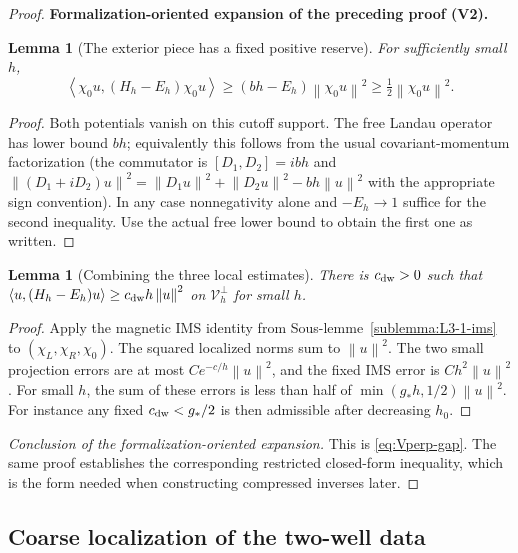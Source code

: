 \documentclass[11pt]{article}
\newtheorem{lemma}[theorem]{Lemma}
\newcommand{\formalisationparentid}{X}
\newenvironment{formalisationaddition}[1]{\par\medskip\begingroup\color{blue}\def\formalisationparentid{#1}\setcounter{formalizationsublemma}{0}\let\lemma\formalizationsublemma\let\endlemma\endformalizationsublemma
  \def\Eo{\mathcal E_h^\circ}\def\EE{\mathcal E_h}\def\phio{\phi_h^\circ}\def\phih{\phi_h}\def\Ho{H_h^{\rm atom}(v^\circ)}\def\Ha{H_h^{\rm atom}}\def\HL{H_h^{L}}\def\Dh{D_h}\def\Log{\operatorname{Log}}\def\ellh{\ell_h}\def\Gp{G_{p,h}}\def\Ast{A_{*,h}}\def\ahat{\widehat{\mathfrak a}_h}\def\ah{\mathfrak a_h}\def\rh{\widehat\rho_h}\def\deltah{\widehat\delta_h}\def\oldref##1{\textup{(##1)}}\def\interface##1{\par\noindent\textit{Analytical interface used here.} ##1\par}\def\finish{\par\noindent\textit{Conclusion of the formalization-oriented expansion.} }\par\noindent\textbf{Formalization-oriented expansion of the preceding proof (V2).}\par\smallskip
}{\par\endgroup\medskip
}
\newcommand{\norm}[1]{\left\|#1\right\|}
\newcommand{\ip}[2]{\left\langle #1,#2\right\rangle}
\begin{document}
\begin{proof}
\begin{formalisationaddition}{T4.2}
\begin{lemma}[The exterior piece has a fixed positive reserve]\label{sublemma:T4-2-outside}
For sufficiently small $h$,
\begin{equation*}
 \ip{\chi_0u}{(H_h-E_h)\chi_0u}
 \ge(bh-E_h)\norm{\chi_0u}^2\ge\tfrac12\norm{\chi_0u}^2.
\end{equation*}
\end{lemma}
\begin{proof}
Both potentials vanish on this cutoff support. The free Landau operator has lower bound $bh$; equivalently this follows from the usual covariant-momentum factorization (the commutator is $[D_1,D_2]=ibh$ and $\norm{(D_1+iD_2)u}^2=\norm{D_1u}^2+\norm{D_2u}^2-bh\norm u^2$ with the appropriate sign convention). In any case nonnegativity alone and $-E_h\to1$ suffice for the second inequality. Use the actual free lower bound to obtain the first one as written.
\end{proof}

\begin{lemma}[Combining the three local estimates]\label{sublemma:T4-2-absorption}
There is $c_{\rm dw}>0$ such that
$\ip u{(H_h-E_h)u}\ge c_{\rm dw}h\norm u^2$ on $\mathcal V_h^\perp$ for small $h$.
\end{lemma}
\begin{proof}
Apply the magnetic IMS identity from Sous-lemme~\ref{sublemma:L3-1-ims} to $(\chi_L,\chi_R,\chi_0)$. The squared localized norms sum to $\norm u^2$. The two small projection errors are at most $Ce^{-c/h}\norm u^2$, and the fixed IMS error is $Ch^2\norm u^2$. For small $h$, the sum of these errors is less than half of $\min(g_*h,1/2)\norm u^2$. For instance any fixed $c_{\rm dw}<g_*/2$ is then admissible after decreasing $h_0$.
\end{proof}
\finish This is \eqref{eq:Vperp-gap}. The same proof establishes the corresponding restricted closed-form inequality, which is the form needed when constructing compressed inverses later.
\end{formalisationaddition}

\end{proof}

\subsection{Coarse localization of the two-well data}\label{sec:overlap-ledger}\label{sec:coarse-defect-residual}
\end{document}
